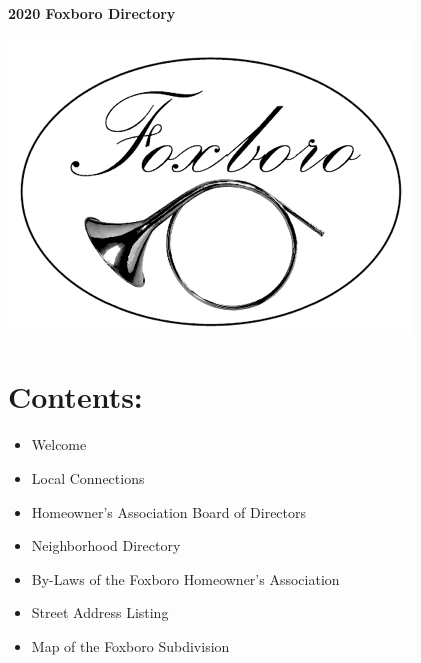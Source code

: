 \documentclass[10pt]{report}
\begin{document}
\setcounter{secnumdepth}{0}

{\centering
  {\Huge \textbf{2020 Foxboro Directory}
  }
}


\includegraphics[]{foxboro_logo.png}

\section{Contents:}
\begin{itemize}
	\item Welcome
	\item Local Connections
	\item Homeowner’s Association Board of Directors
	\item Neighborhood Directory
	\item By-Laws of the Foxboro Homeowner’s Association
	\item Street Address Listing
	\item Map of the Foxboro Subdivision
\end{itemize}
\newpage



\newpage


\newpage


\newpage


\newpage
\end{document}
